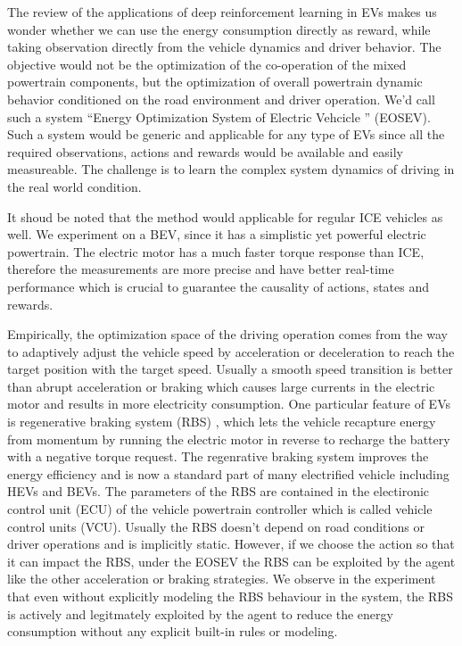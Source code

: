 \documentclass{article}
\begin{document}
The review of the applications of deep reinforcement learning in EVs makes us wonder whether we can use the energy consumption directly as reward, while taking observation directly from the vehicle dynamics and driver behavior. The objective would not be the optimization of the co-operation of the mixed powertrain components, but the optimization of overall powertrain dynamic behavior conditioned on the road environment and driver operation. We'd call such a system ``Energy Optimization System of Electric Vehcicle '' (EOSEV). Such a system would be generic and applicable for any type of EVs since all the required observations, actions and rewards would be available and easily measureable. The challenge is to learn the complex system dynamics of driving in the real world condition.

It shoud be noted that the method would applicable for regular ICE vehicles as well. We experiment on a BEV, since it has a simplistic yet powerful electric powertrain. The electric motor has a much faster torque response than ICE, therefore the measurements are more precise and have better real-time performance which is crucial to guarantee the causality of actions, states and rewards.

Empirically, the optimization space of the driving operation comes from the way to adaptively adjust the vehicle speed by acceleration or deceleration to reach the target position with the target speed. Usually a smooth speed transition is better than abrupt acceleration or braking which causes large currents in the electric motor and results in more electricity consumption. One particular feature of EVs is regenerative braking system (RBS) \parencite{enwiki:1228286642}, which lets the vehicle recapture energy from momentum by running the electric motor in reverse to recharge the battery with a negative torque request. The regenrative braking system improves the energy efficiency and is now a standard part of many electrified vehicle including HEVs and BEVs. The parameters of the RBS are contained in the electironic control unit (ECU) of the vehicle powertrain controller which is called vehicle control units (VCU). Usually the RBS doesn't depend on road conditions or driver operations and is implicitly static. However, if we choose the action so that it can impact the RBS, under the EOSEV the RBS can be exploited by the agent like the other acceleration or braking strategies. We observe in the experiment that even without explicitly modeling the RBS behaviour in the system, the RBS is actively and legitmately exploited by the agent to reduce the energy consumption without any explicit built-in rules or modeling.
\end{document}
